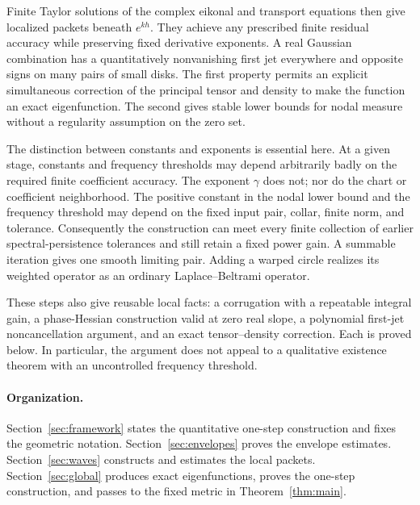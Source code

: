 Finite Taylor solutions of the complex eikonal and transport equations
then give localized packets beneath $e^{kh}$. They achieve any prescribed
finite residual accuracy while preserving fixed derivative exponents.
A real Gaussian combination has a quantitatively nonvanishing first
jet everywhere and opposite signs on many pairs of small disks.
The first property permits an explicit simultaneous correction of the
principal tensor and density to make the function an exact
eigenfunction. The second gives stable lower bounds for nodal measure
without a regularity assumption on the zero set.

The distinction between constants and exponents is essential here.
At a given stage, constants and frequency thresholds may depend
arbitrarily badly on the required finite coefficient accuracy.
The exponent $\gamma$ does not; nor do the chart or coefficient
neighborhood. The positive constant in the nodal lower bound and the frequency threshold
may depend on the fixed input pair, collar, finite norm, and tolerance.
Consequently the construction can
meet every finite collection of earlier spectral-persistence tolerances
and still retain a fixed power gain. A summable iteration gives one
smooth limiting pair. Adding a warped circle realizes its weighted
operator as an ordinary Laplace--Beltrami operator.

These steps also give reusable local facts: a corrugation with a
repeatable integral gain, a phase-Hessian construction valid at zero
real slope, a polynomial first-jet noncancellation argument, and an
exact tensor--density correction. Each is proved below. In particular,
the argument does not appeal to a qualitative existence theorem with an
uncontrolled frequency threshold.

\paragraph{Organization.}
Section~\ref{sec:framework} states the quantitative one-step construction
and fixes the geometric notation.
Section~\ref{sec:envelopes} proves the envelope estimates.
Section~\ref{sec:waves} constructs and estimates the local packets.
Section~\ref{sec:global} produces exact eigenfunctions, proves the
one-step construction, and passes to the fixed metric in
Theorem~\ref{thm:main}.
